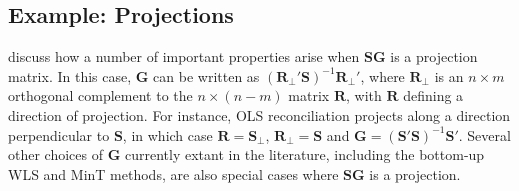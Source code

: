 \documentclass[12pt]{article}
\theoremstyle{definition}
\begin{document}
\subsection*{Example: Projections}
\cite{PanEtAl2019HF} discuss how a number of important properties arise when $\bm{S}\bm{G}$ is a projection matrix.  In this case, ${\bm G}$ can be written as $(\bm{R}_{\perp}'\bm{S})^{-1}\bm{R}_{\perp}'$, where $\bm{R}_{\perp}$ is an $n\times m$ orthogonal complement to the $n\times(n-m)$ matrix $\bm{R}$, with $\bm{R}$ defining a direction of projection.  For instance, OLS reconciliation projects along a direction perpendicular to $\bm{S}$, in which case $\bm{R}=\bm{S}_{\perp}$, $\bm{R}_{\perp}=\bm{S}$ and $\bm{G}=(\bm{S}'\bm{S})^{-1}\bm{S}'$.  Several other choices of $\bm{G}$ currently extant in the literature, including the bottom-up \citep{Dunn1976} WLS and MinT \citep{HynEtAl2011,WicEtAl2019} methods, are also special cases where $\bm{S}\bm{G}$ is a projection.  

\end{document}
